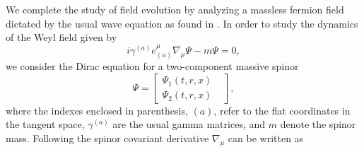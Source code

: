 \documentclass[preprint]{revtex4-1}
\begin{document}
We complete the study of field evolution by analyzing a massless fermion field dictated by the usual wave equation as found in \cite{Chandrasekhar:1985kt}. In order to study the dynamics of the Weyl field given by
\begin{equation}\label{dirac1}
i\gamma^{(a)}e_{(a)}^{\mu}\nabla_{\mu}\Psi-m\Psi=0,
\end{equation}
we consider the Dirac equation for a two-component massive spinor
\begin{equation}\label{two_spinor}
\Psi=\begin{bmatrix}
    \Psi_1(t,r,x) & \\
    \Psi_2(t,r,x) &
\end{bmatrix},
\end{equation}
where the indexes enclosed in parenthesis, $(a)$, refer to the flat coordinates in the tangent space, $\gamma^{(a)}$ are the usual gamma matrices, and $m$ denote the spinor mass. Following \cite{CuadrosMelgar:2011up} the spinor covariant derivative $\nabla_{\mu}$ can be written as
\end{document}
